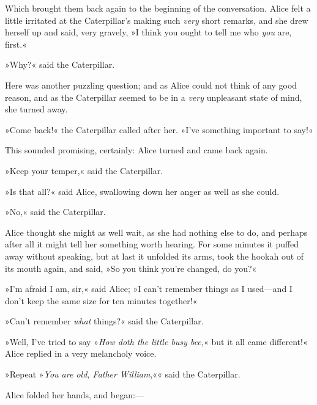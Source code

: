 Which brought them back again to the beginning of the conversation. Alice felt a little irritated at the Caterpillar's making such \textit{very} short remarks, and she drew herself up and said, very gravely, »I think you ought to tell me who \textit{you} are, first.«

»Why?« said the Caterpillar.

Here was another puzzling question; and as Alice could not think of any good reason, and as the Caterpillar seemed to be in a \textit{very} unpleasant state of mind, she turned away.

»Come back!« the Caterpillar called after her. »I've something important to say!«

This sounded promising, certainly: Alice turned and came back again.

»Keep your temper,« said the Caterpillar.

»Is that all?« said Alice, swallowing down her anger as well as she could.

»No,« said the Caterpillar.

Alice thought she might as well wait, as she had nothing else to do, and perhaps after all it might tell her something worth hearing. For some minutes it puffed away without speaking, but at last it unfolded its arms, took the hookah out of its mouth again, and said, »So you think you're changed, do you?«

»I'm afraid I am, sir,« said Alice; »I can't remember things as I used—and I don't keep the same size for ten minutes together!«

»Can't remember \textit{what} things?« said the Caterpillar.

»Well, I've tried to say »\textit{How doth the little busy bee,}« but it all came different!« Alice replied in a very melancholy voice.

»Repeat »\textit{You are old, Father William},«« said the Caterpillar.

Alice folded her hands, and began:—

